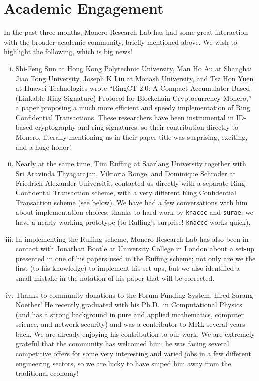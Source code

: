 \documentclass[12pt,english]{mrl}
\theoremstyle{definition}
\numberwithin{equation}{section}
\numberwithin{figure}{section}
\numberwithin{equation}{section}
\numberwithin{equation}{section}
\numberwithin{figure}{section}
\begin{document}
\section{Academic Engagement}\label{sec:academ}

In the past three months, Monero Research Lab has had some great interaction with the broader academic community, briefly mentioned above. We wish to highlight the following, which is big news!

\begin{enumerate}[(i)]

\item Shi-Feng Sun at Hong Kong Polytechnic University, Man Ho Au at Shanghai Jiao Tong University, Joseph K Liu at Monash University, and Tsz Hon Yuen at Huawei Technologies wrote ``RingCT 2.0: A Compact Accumulator-Based (Linkable Ring Signature) Protocol for Blockchain Cryptocurrency Monero,'' a paper proposing a much more efficient and speedy implementation of Ring Confidential Transactions. These researchers have been instrumental in ID-based cryptography and ring signatures, so their contribution directly to Monero, literally mentioning us in their paper title was surprising, exciting, and a huge honor!

\item  Nearly at the same time, Tim Ruffing at Saarlang University together with Sri Aravinda Thyagarajan, Viktoria Ronge, and Dominique Schr{\"o}der at Friedrich-Alexander-Universit{\"a}t contacted us directly with a separate Ring Confidental Transaction scheme, with a very different Ring Confidential Transaction scheme (see below). We have had a few conversations with him about implementation choices; thanks to hard work by \texttt{knaccc} and \texttt{surae}, we have a nearly-working prototype (to Ruffing's surprise! \texttt{knaccc} works quick).

\item In implementing the Ruffing scheme, Monero Research Lab has also been in contact with Jonathan Bootle at University College in London about a set-up presented in one of his papers used in the Ruffing scheme; not only are we the first (to his knowledge) to implement his set-ups, but we also identified a small mistake in the notation of his paper that will be corrected.

\item Thanks to community donations to the Forum Funding System, hired Sarang Noether! He recently graduated with his Ph.D.\ in Computational Physics (and has a strong background in pure and applied mathematics, computer science, and network security) and was a contributor to MRL several years back. We are already enjoying his contribution to our work. We are extremely grateful that the community has welcomed him; he was facing several competitive offers for some very interesting and varied jobs in a few different engineering sectors, so we are lucky to have sniped him away from the traditional economy!

\end{enumerate}
\end{document}
